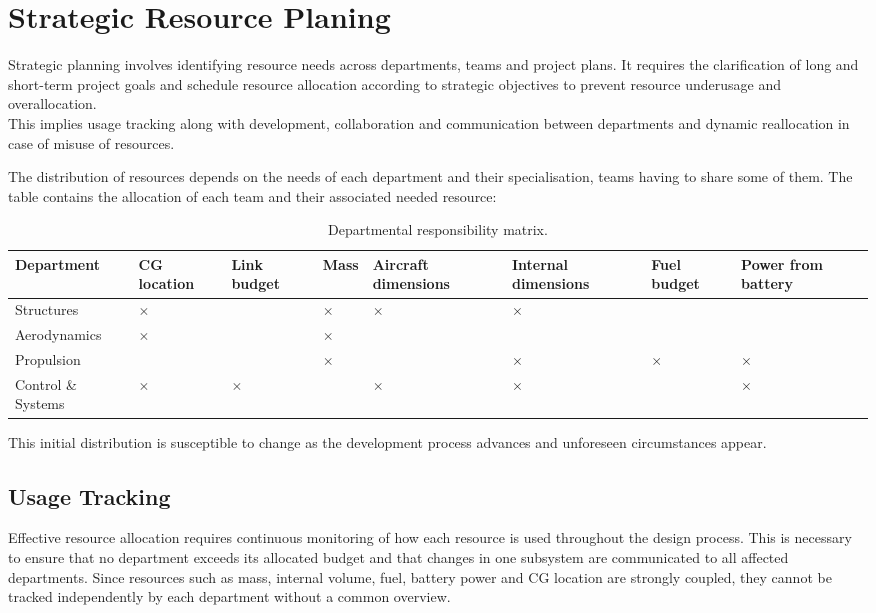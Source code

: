 \section{Strategic Resource Planing}
Strategic planning involves identifying resource needs across departments, teams and project plans. It requires the clarification of long and short-term project goals and schedule resource allocation according to strategic objectives to prevent resource underusage and overallocation. 
\\
This implies usage tracking along with development, collaboration and communication between departments and dynamic reallocation in case of misuse of resources.

The distribution of resources depends on the needs of each department and their specialisation, teams having to share some of them. The table contains the allocation of each team and their associated needed resource: 

\begin{table}[H]
\centering
\caption{Departmental responsibility matrix.}
\label{tab:responsibility_matrix}
\small
\begin{tabular}{|p{2.5cm}|p{1.7cm}|p{1.7cm}|p{1.2cm}|p{1.6cm}|p{1.7cm}|p{1.5cm}|p{1.7cm}|}
\hline 
\textbf{Department} 
& \textbf{CG location} 
& \textbf{Link budget} 
& \textbf{Mass} 
& \textbf{Aircraft dimensions} 
& \textbf{Internal dimensions} 
& \textbf{Fuel budget} 
& \textbf{Power from battery} \\
\hline \hline
Structures & $\times$ &  & $\times$ & $\times$ & $\times$ &  &  \\
\hline
Aerodynamics & $\times$ &  & $\times$ &  &  &  &  \\
\hline
Propulsion &  &  & $\times$ &  & $\times$ & $\times$ & $\times$ \\
\hline
Control \& Systems & $\times$ & $\times$ &  & $\times$ & $\times$ &  & $\times$ \\
\hline
\end{tabular}
\end{table}

This initial distribution is susceptible to change as the development process advances and unforeseen circumstances appear.

\subsection{Usage Tracking}
Effective resource allocation requires continuous monitoring of how each resource is used throughout the design process. This is necessary to ensure that no department exceeds its allocated budget and that changes in one subsystem are communicated to all affected departments. Since resources such as mass, internal volume, fuel, battery power and CG location are strongly coupled, they cannot be tracked independently by each department without a common overview.


